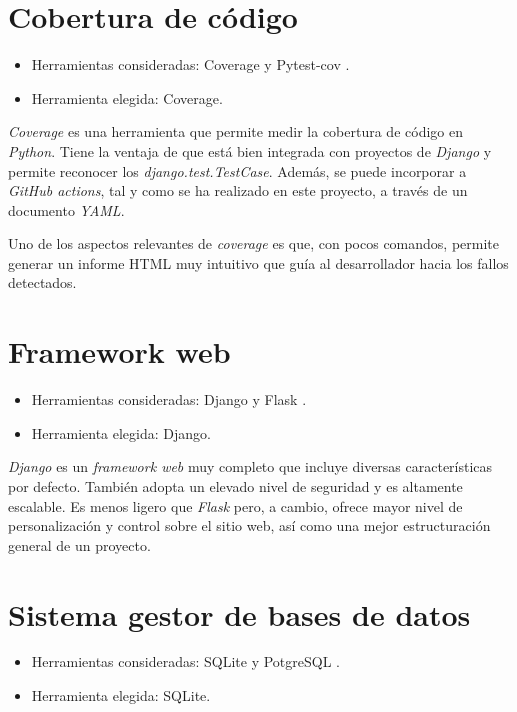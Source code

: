 \section{Cobertura de código}\label{cobertura_codigo}

\begin{itemize}
\tightlist
\item
  Herramientas consideradas: Coverage  \citep{online:coverage} y Pytest-cov \citep{online:pytest_cov}.
\item
  Herramienta elegida: Coverage.
\end{itemize}

\emph{Coverage} es una herramienta que permite medir la cobertura de código en \emph{Python}. 
Tiene la ventaja de que está bien integrada con proyectos de \emph{Django} y permite reconocer
los \emph{django.test.TestCase}. Además, se puede incorporar a \emph{GitHub actions}, tal y como 
se ha realizado en este proyecto, a través de un documento \emph{YAML}.

Uno de los aspectos relevantes de \emph{coverage} es que, con pocos comandos, permite generar
un informe HTML muy intuitivo que guía al desarrollador hacia los fallos detectados. 


\section{Framework web}\label{framework_web}

\begin{itemize}
\tightlist
\item
  Herramientas consideradas: Django \citep{online:django} y Flask \citep{online:flask}.
\item
  Herramienta elegida: Django.
\end{itemize}

\emph{Django} es un \emph{framework web} muy completo que incluye diversas características por defecto. También adopta un elevado nivel de seguridad y es altamente escalable. Es menos ligero que
\emph{Flask} pero, a cambio, ofrece mayor nivel de personalización y control sobre el sitio web, así como una mejor estructuración general de un proyecto.  


\section{Sistema gestor de bases de datos}\label{sgbd}

\begin{itemize}
\tightlist
\item
  Herramientas consideradas: SQLite \citep{online:sqlite} y PotgreSQL \citep{online:postgresql}.
\item
  Herramienta elegida: SQLite.
\end{itemize}


